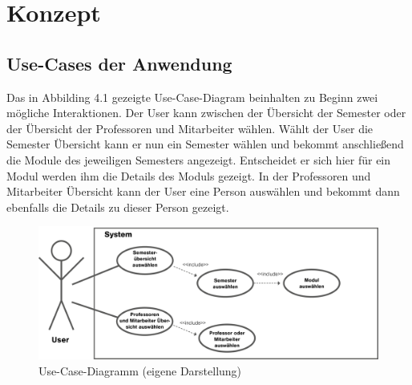 \documentclass[12pt,					%
							 oneside,			%
							 a4paper,			%
							 halfparskip,		%
							 liststotoc,			%
							 bibtotoc,			%
							 fleqn,				%
							 pointlessnumbers]	%
							 {scrreprt}
\begin{document}
				


\chapter{Konzept}			
		\section{Use-Cases der Anwendung}	
		Das in Abbilding 4.1 gezeigte Use-Case-Diagram beinhalten zu Beginn zwei mögliche Interaktionen. Der User kann zwischen der Übersicht der Semester oder der Übersicht der Professoren und Mitarbeiter wählen. Wählt der User die Semester Übersicht kann er nun ein Semester wählen und bekommt anschließend die Module des jeweiligen Semesters angezeigt. Entscheidet er sich hier für ein Modul werden ihm die Details des Moduls gezeigt. In der Professoren und Mitarbeiter Übersicht kann der User eine Person auswählen und bekommt dann ebenfalls die Details zu dieser Person gezeigt.
\begin{figure}[h]
						\centering
						\includegraphics[width=1\textwidth]{pictures/use-cases.png}
						\caption{Use-Case-Diagramm (eigene Darstellung)}							
						\label{Use-Case-Diagramm}
					\end{figure}	
		
\end{document}
